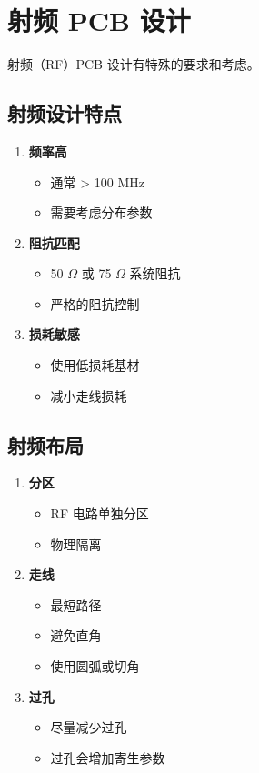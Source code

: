 \section{射频 PCB 设计}

射频（RF）PCB 设计有特殊的要求和考虑。

\subsection{射频设计特点}

\begin{enumerate}
  \item \textbf{频率高}
    \begin{itemize}
      \item 通常 > 100 MHz
      \item 需要考虑分布参数
    \end{itemize}

  \item \textbf{阻抗匹配}
    \begin{itemize}
      \item 50 $\Omega$ 或 75 $\Omega$ 系统阻抗
      \item 严格的阻抗控制
    \end{itemize}

  \item \textbf{损耗敏感}
    \begin{itemize}
      \item 使用低损耗基材
      \item 减小走线损耗
    \end{itemize}
\end{enumerate}

\subsection{射频布局}

\begin{enumerate}
  \item \textbf{分区}
    \begin{itemize}
      \item RF 电路单独分区
      \item 物理隔离
    \end{itemize}

  \item \textbf{走线}
    \begin{itemize}
      \item 最短路径
      \item 避免直角
      \item 使用圆弧或切角
    \end{itemize}

  \item \textbf{过孔}
    \begin{itemize}
      \item 尽量减少过孔
      \item 过孔会增加寄生参数
    \end{itemize}
\end{enumerate}

